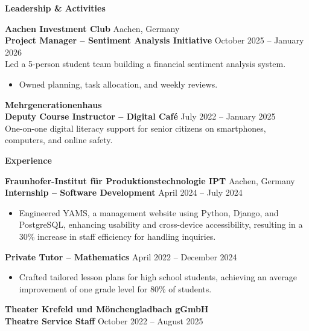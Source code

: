 \documentclass[10pt]{article}
\begin{document}
\vspace{1pt}

\begin{center}
    \textbf{\large Leadership \& Activities}
\end{center}

\textbf{Aachen Investment Club} \hfill Aachen, Germany \\
\textbf{Project Manager – Sentiment Analysis Initiative} \hfill October 2025 – January 2026 \\
Led a 5-person student team building a financial sentiment analysis system.
\begin{itemize}[noitemsep, topsep=1pt, partopsep=0pt, parsep=0pt]
    \item Owned planning, task allocation, and weekly reviews.
\end{itemize}
\vspace{4pt}

\textbf{Mehrgenerationenhaus} \\
\textbf{Deputy Course Instructor – Digital Café} \hfill July 2022 – January 2025 \\
One-on-one digital literacy support for senior citizens on smartphones, computers, and online safety.

\vspace{1pt}

\begin{center}
    \textbf{\large Experience}
\end{center}

\textbf{Fraunhofer-Institut für Produktionstechnologie IPT} \hfill Aachen, Germany \\
\textbf{Internship – Software Development} \hfill April 2024 – July 2024
\begin{itemize}[noitemsep, topsep=1pt, partopsep=0pt, parsep=0pt]
    \item Engineered YAMS, a management website using Python, Django, and PostgreSQL, enhancing usability and cross-device accessibility, resulting in a 30\% increase in staff efficiency for handling inquiries.
\end{itemize}
\vspace{4pt}

\textbf{Private Tutor – Mathematics} \hfill April 2022 – December 2024
\begin{itemize}[noitemsep, topsep=1pt, partopsep=0pt, parsep=0pt]
    \item Crafted tailored lesson plans for high school students, achieving an average improvement of one grade level for 80\% of students.
\end{itemize}
\vspace{4pt}

\textbf{Theater Krefeld und Mönchengladbach gGmbH} \\
\textbf{Theatre Service Staff} \hfill October 2022 – August 2025
\end{document}
